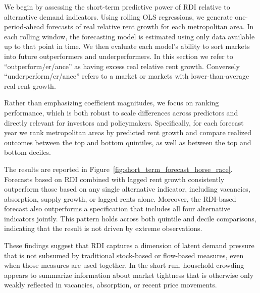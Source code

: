 \documentclass[pdflatex,sn-basic]{sn-jnl}%
\theoremstyle{thmstyleone}%
\theoremstyle{thmstyletwo}%
\theoremstyle{thmstylethree}%
\begin{document}
We begin by assessing the short-term predictive power of RDI relative to alternative demand indicators. Using rolling OLS regressions, we generate one-period-ahead forecasts of real relative rent growth for each metropolitan area. In each rolling window, the forecasting model is estimated using only data available up to that point in time. We then evaluate each model’s ability to sort markets into future outperformers and underperformers. In this section we refer to  ``outperform/er/ance'' as having excess real relative rent growth. Conversely ``underperform/er/ance'' refers to a market or markets with lower-than-average real rent growth. 

Rather than emphasizing coefficient magnitudes, we focus on ranking performance, which is both robust to scale differences across predictors and directly relevant for investors and policymakers. Specifically, for each forecast year we rank metropolitan areas by predicted rent growth and compare realized outcomes between the top and bottom quintiles, as well as between the top and bottom deciles.

The results are reported in Figure~\ref{fig:short_term_forecast_horse_race}. Forecasts based on RDI combined with lagged rent growth consistently outperform those based on any single alternative indicator, including vacancies, absorption, supply growth, or lagged rents alone. Moreover, the RDI-based forecast also outperforms a specification that includes all four alternative indicators jointly. This pattern holds across both quintile and decile comparisons, indicating that the result is not driven by extreme observations.

These findings suggest that RDI captures a dimension of latent demand pressure that is not subsumed by traditional stock-based or flow-based measures, even when those measures are used together. In the short run, household crowding appears to summarize information about market tightness that is otherwise only weakly reflected in vacancies, absorption, or recent price movements.
\end{document}
